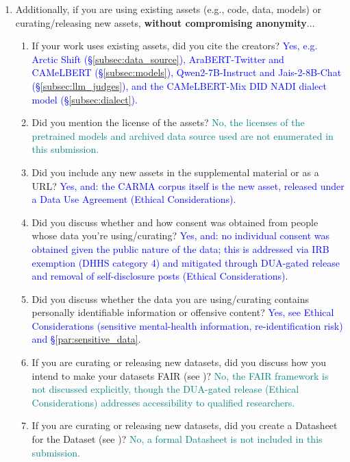 \documentclass[letterpaper]{article} %
\newcommand{\answerYes}[1]{\textcolor{blue}{#1}}
\newcommand{\answerNo}[1]{\textcolor{teal}{#1}}
\begin{document}
\begin{enumerate}
\item Additionally, if you are using existing assets (e.g., code, data, models) or curating/releasing new assets, \textbf{without compromising anonymity}...
\begin{enumerate}
  \item If your work uses existing assets, did you cite the creators?
    \answerYes{Yes, e.g. Arctic Shift (\S\ref{subsec:data_source}), AraBERT-Twitter and CAMeLBERT (\S\ref{subsec:models}), Qwen2-7B-Instruct and Jais-2-8B-Chat (\S\ref{subsec:llm_judges}), and the CAMeLBERT-Mix DID NADI dialect model (\S\ref{subsec:dialect}).}
  \item Did you mention the license of the assets?
    \answerNo{No, the licenses of the pretrained models and archived data source used are not enumerated in this submission.}
  \item Did you include any new assets in the supplemental material or as a URL?
    \answerYes{Yes, and: the CARMA corpus itself is the new asset, released under a Data Use Agreement (Ethical Considerations).}
  \item Did you discuss whether and how consent was obtained from people whose data you're using/curating?
    \answerYes{Yes, and: no individual consent was obtained given the public nature of the data; this is addressed via IRB exemption (DHHS category 4) and mitigated through DUA-gated release and removal of self-disclosure posts (Ethical Considerations).}
  \item Did you discuss whether the data you are using/curating contains personally identifiable information or offensive content?
    \answerYes{Yes, see Ethical Considerations (sensitive mental-health information, re-identification risk) and \S\ref{par:sensitive_data}.}
\item If you are curating or releasing new datasets, did you discuss how you intend to make your datasets FAIR (see \citet{fair})?
\answerNo{No, the FAIR framework is not discussed explicitly, though the DUA-gated release (Ethical Considerations) addresses accessibility to qualified researchers.}
\item If you are curating or releasing new datasets, did you create a Datasheet for the Dataset (see \citet{gebru2021datasheets})?
\answerNo{No, a formal Datasheet is not included in this submission.}
\end{enumerate}


\end{enumerate}
\end{document}

